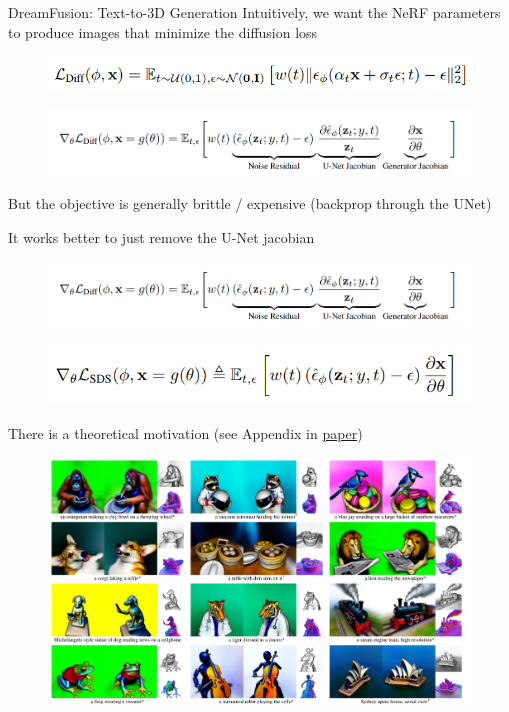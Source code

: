 \begin{frame}[allowframebreaks]{DreamFusion: Text-to-3D Generation}
    Intuitively, we want the NeRF parameters to produce images that minimize the diffusion loss
    \begin{figure}
        \centering
        \includegraphics[width=0.85\linewidth,height=\textheight,keepaspectratio]{images/adv-img-gen/slide_157_1_img.png}
    \end{figure}\begin{figure}
        \centering
        \includegraphics[width=1.05\linewidth,height=\textheight,keepaspectratio]{images/adv-img-gen/slide_157_2_img.png}
    \end{figure}
    But the objective is generally brittle / expensive (backprop through the UNet)

    \framebreak
    It works better to just remove the U-Net jacobian
    \begin{figure}
        \centering
        \includegraphics[width=1.05\linewidth,height=\textheight,keepaspectratio]{images/adv-img-gen/slide_158_1_img.png}
    \end{figure}\begin{figure}
        \centering
        \includegraphics[width=1.05\linewidth,height=\textheight,keepaspectratio]{images/adv-img-gen/slide_158_2_img.png}
    \end{figure}
    There is a theoretical motivation (see Appendix in \href{https://arxiv.org/abs/2209.14988}{paper})

    \framebreak
    \begin{figure}
        \centering
        \includegraphics[width=1.05\linewidth,height=\textheight,keepaspectratio]{images/adv-img-gen/slide_159_1_img.png}
    \end{figure}
\end{frame}